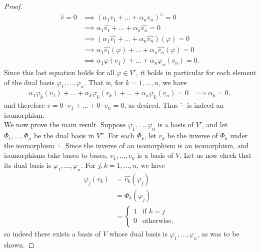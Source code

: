\documentclass{extarticle}
\begin{document}
\begin{proof}
\begin{align*}
\hat{v} = 0 &\implies (\alpha_1v_1+\dots+\alpha_nv_n)^\wedge = 0\\
 &\implies \alpha_1\widehat{v_1} + \dots + \alpha_n\widehat{v_n} = 0\\
 &\implies (\alpha_1\widehat{v_1} + \dots + \alpha_n\widehat{v_n})(\varphi) = 0\\
 &\implies \alpha_1\widehat{v_1}(\varphi) + \dots + \alpha_n\widehat{v_n}(\varphi) = 0\\
 &\implies \alpha_1\varphi(v_1) + \dots + \alpha_n\varphi_n(v_n) = 0. 
\end{align*}
Since this last equation holds for all $\varphi\in V'$, it holds in particular for each element of the dual basis $\varphi_1,\dots, \varphi_n$.  That is, for $k= 1,\dots,n$, we have
\begin{align*}
\alpha_1\varphi_k(v_1) + \dots + \alpha_k\varphi_k(v_k) + \dots + \alpha_n\varphi_k(v_n) = 0 &\implies \alpha_k = 0,
\end{align*}
and therefore $v= 0\cdot v_1+\dots + 0\cdot v_n = 0$, as desired.  Thus $\hat{\cdot}$ is indeed an isomorphism.\\
\indent We now prove the main result.  Suppose $\varphi_1,\dots, \varphi_n$ is a basis of $V'$, and let $\Phi_1,\dots,\Phi_n$ be the dual basis in $V''$.  For each $\Phi_k$, let $v_k$ be the inverse of $\Phi_k$ under the isomorphism $\hat{\cdot}$.  Since the inverse of an isomorphism is an isomorphism, and isomorphisms take bases to bases, $v_1,\dots, v_n$ is a basis of $V$.  Let us now check that its dual basis is $\varphi_1,\dots,\varphi_n$.  For $j,k = 1,\dots, n$, we have
\begin{align*}
\varphi_j(v_k) &= \widehat{v_k}(\varphi_j)\\
&= \Phi_k(\varphi_j)\\
&=\begin{cases}1 &\text{if }k = j\\ 0&\text{otherwise,}\end{cases}
\end{align*}
so indeed there exists a basis of $V$ whose dual basis is $\varphi_1,\dots, \varphi_n$, as was to be shown.
\end{proof}
\end{document}
